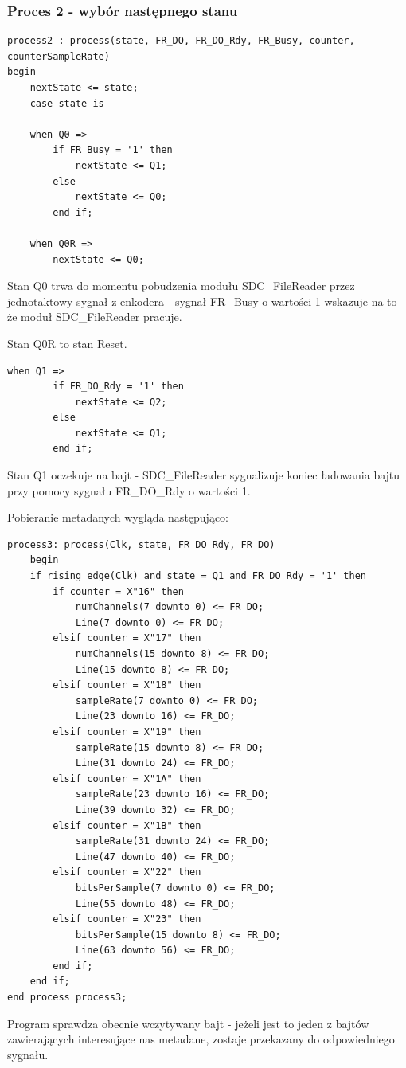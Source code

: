 \documentclass{article}
\begin{document}
\subsubsection{Proces 2 - wybór następnego stanu}
\begin{lstlisting}[basicstyle=\small]
process2 : process(state, FR_DO, FR_DO_Rdy, FR_Busy, counter, counterSampleRate)
begin
	nextState <= state;
	case state is
	
	when Q0 =>
		if FR_Busy = '1' then
			nextState <= Q1;
		else
			nextState <= Q0;
		end if;
		
	when Q0R =>
		nextState <= Q0;
\end{lstlisting}
\par Stan Q0 trwa do momentu pobudzenia modułu SDC\_FileReader przez jednotaktowy sygnał z enkodera - sygnał FR\_Busy o wartości 1 wskazuje na to że moduł SDC\_FileReader pracuje.
\par Stan Q0R to stan Reset.
\begin{lstlisting}[basicstyle=\small]
	when Q1 =>
		if FR_DO_Rdy = '1' then              
			nextState <= Q2;
		else
			nextState <= Q1;
		end if;
\end{lstlisting}
\par Stan Q1 oczekuje na bajt - SDC\_FileReader sygnalizuje koniec ładowania bajtu przy pomocy sygnału FR\_DO\_Rdy o wartości 1. 
\par Pobieranie metadanych wygląda następująco:
\begin{lstlisting}[basicstyle=\small]
process3: process(Clk, state, FR_DO_Rdy, FR_DO)
	begin
	if rising_edge(Clk) and state = Q1 and FR_DO_Rdy = '1' then
		if counter = X"16" then
			numChannels(7 downto 0) <= FR_DO;
			Line(7 downto 0) <= FR_DO;
		elsif counter = X"17" then
			numChannels(15 downto 8) <= FR_DO;
			Line(15 downto 8) <= FR_DO;
		elsif counter = X"18" then
			sampleRate(7 downto 0) <= FR_DO;
			Line(23 downto 16) <= FR_DO;
		elsif counter = X"19" then
			sampleRate(15 downto 8) <= FR_DO;
			Line(31 downto 24) <= FR_DO;
		elsif counter = X"1A" then
			sampleRate(23 downto 16) <= FR_DO;
			Line(39 downto 32) <= FR_DO;
		elsif counter = X"1B" then
			sampleRate(31 downto 24) <= FR_DO;
			Line(47 downto 40) <= FR_DO;
		elsif counter = X"22" then
			bitsPerSample(7 downto 0) <= FR_DO;
			Line(55 downto 48) <= FR_DO;
		elsif counter = X"23" then
			bitsPerSample(15 downto 8) <= FR_DO;
			Line(63 downto 56) <= FR_DO;
		end if;
	end if;
end process process3; 
\end{lstlisting}
\par Program sprawdza obecnie wczytywany bajt - jeżeli jest to jeden z bajtów zawierających interesujące nas metadane, zostaje przekazany do odpowiedniego sygnału.
\end{document}
